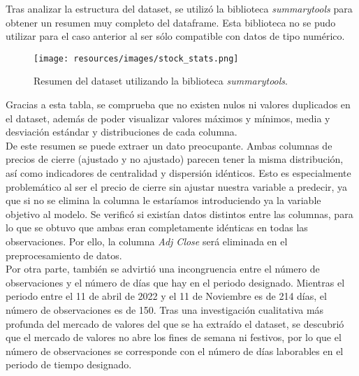 \documentclass[a4paper, 12pt]{report}
\begin{document}
                        Tras analizar la estructura del dataset, se utilizó la biblioteca \textit{summarytools} para obtener un resumen muy completo del dataframe.
                        Esta biblioteca no se pudo utilizar para el caso anterior al ser sólo compatible con datos de tipo numérico.\\

                        \begin{figure}[H]
                                \centering
                                \texttt{[image: resources/images/stock\_stats.png]}
                                \caption{Resumen del dataset utilizando la biblioteca \textit{summarytools}.}
                                \label{fig:summarytools}
                        \end{figure}

                        Gracias a esta tabla, se comprueba que no existen nulos ni valores duplicados en el dataset, además de poder visualizar
                        valores máximos y mínimos, media y desviación estándar y distribuciones de cada columna.\\

                        De este resumen se puede extraer un dato preocupante. Ambas columnas de precios de cierre (ajustado y no ajustado) parecen tener la misma
                        distribución, así como indicadores de centralidad y dispersión idénticos. Esto es especialmente problemático al ser el precio de cierre 
                        sin ajustar nuestra variable a predecir, ya que si no se elimina la columna le estaríamos introduciendo ya la variable objetivo al modelo. Se verificó si existían datos
                        distintos entre las columnas, para lo que se obtuvo que ambas eran completamente idénticas en todas las observaciones. Por ello, la columna \textit{Adj Close} será
                        eliminada en el preprocesamiento de datos. \\

                        Por otra parte, también se advirtió una incongruencia entre el número de observaciones y el número de días que hay en el periodo designado.
                        Mientras el periodo entre el 11 de abril de 2022 y el 11 de Noviembre es de 214 días, el número de observaciones es de 150. Tras una investigación cualitativa más profunda del 
                        mercado de valores del que se ha extraído el dataset, se descubrió que el mercado de valores no abre los fines de semana ni festivos, por lo que el número de observaciones se corresponde con 
                        el número de días laborables en el periodo de tiempo designado.\\
\end{document}
